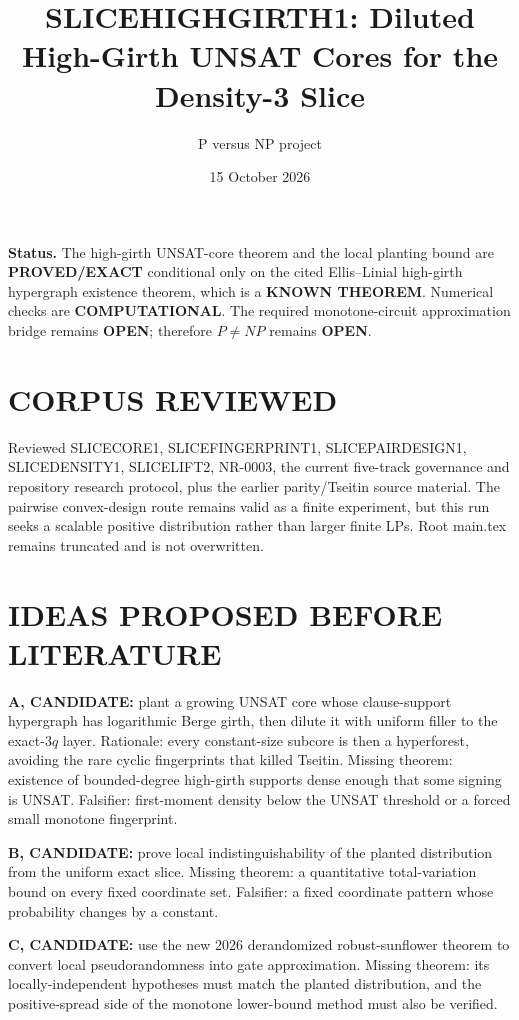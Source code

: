 \documentclass[11pt]{article}
\title{SLICEHIGHGIRTH1: Diluted High-Girth UNSAT Cores for the Density-3 Slice}
\author{P versus NP project}
\date{15 October 2026}
\begin{document}
\maketitle

\noindent\textbf{Status.} The high-girth UNSAT-core theorem and the local planting bound are \textbf{PROVED/EXACT} conditional only on the cited Ellis--Linial high-girth hypergraph existence theorem, which is a \textbf{KNOWN THEOREM}. Numerical checks are \textbf{COMPUTATIONAL}. The required monotone-circuit approximation bridge remains \textbf{OPEN}; therefore $P\ne NP$ remains \textbf{OPEN}.

\section{CORPUS REVIEWED}
Reviewed SLICECORE1, SLICEFINGERPRINT1, SLICEPAIRDESIGN1, SLICEDENSITY1, SLICELIFT2, NR-0003, the current five-track governance and repository research protocol, plus the earlier parity/Tseitin source material. The pairwise convex-design route remains valid as a finite experiment, but this run seeks a scalable positive distribution rather than larger finite LPs. Root main.tex remains truncated and is not overwritten.

\section{IDEAS PROPOSED BEFORE LITERATURE}
\textbf{A, CANDIDATE:} plant a growing UNSAT core whose clause-support hypergraph has logarithmic Berge girth, then dilute it with uniform filler to the exact-$3q$ layer. Rationale: every constant-size subcore is then a hyperforest, avoiding the rare cyclic fingerprints that killed Tseitin. Missing theorem: existence of bounded-degree high-girth supports dense enough that some signing is UNSAT. Falsifier: first-moment density below the UNSAT threshold or a forced small monotone fingerprint.

\textbf{B, CANDIDATE:} prove local indistinguishability of the planted distribution from the uniform exact slice. Missing theorem: a quantitative total-variation bound on every fixed coordinate set. Falsifier: a fixed coordinate pattern whose probability changes by a constant.

\textbf{C, CANDIDATE:} use the new 2026 derandomized robust-sunflower theorem to convert local pseudorandomness into gate approximation. Missing theorem: its locally-independent hypotheses must match the planted distribution, and the positive-spread side of the monotone lower-bound method must also be verified.
\end{document}
